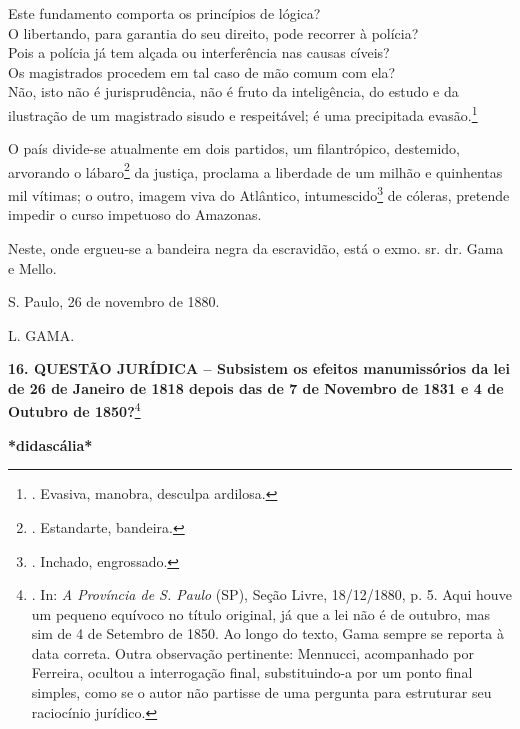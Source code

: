 Este fundamento comporta os princípios de lógica?\\
O libertando, para garantia do seu direito, pode recorrer à polícia?\\
Pois a polícia já tem alçada ou interferência nas causas cíveis?\\
Os magistrados procedem em tal caso de mão comum com ela?\\
Não, isto não é jurisprudência, não é fruto da inteligência, do estudo e
da ilustração de um magistrado sisudo e respeitável; é uma precipitada
evasão.\footnote{. Evasiva, manobra, desculpa ardilosa.}

O país divide-se atualmente em dois partidos, um filantrópico,
destemido, arvorando o lábaro\footnote{. Estandarte, bandeira.} da
justiça, proclama a liberdade de um milhão e quinhentas mil vítimas; o
outro, imagem viva do Atlântico, intumescido\footnote{. Inchado,
  engrossado.} de cóleras,
pretende impedir o curso impetuoso do Amazonas.

Neste, onde ergueu-se a bandeira negra da escravidão, está o exmo. sr.
dr. Gama e Mello.

S. Paulo, 26 de novembro de 1880.

L. GAMA.

\textbf{16. QUESTÃO JURÍDICA -- Subsistem os efeitos manumissórios da
lei de 26 de Janeiro de 1818 depois das de 7 de Novembro de 1831 e 4 de
Outubro de 1850?}\footnote{. In: \emph{A Província de S. Paulo} (SP),
  Seção Livre, 18/12/1880, p. 5. Aqui houve um pequeno equívoco no
  título original, já que a lei não é de outubro, mas sim de 4 de
  Setembro de 1850. Ao longo do texto, Gama sempre se reporta à data
  correta. Outra observação pertinente: Mennucci, acompanhado por
  Ferreira, ocultou a interrogação final, substituindo-a por um ponto
  final simples, como se o autor não partisse de uma pergunta para
  estruturar seu raciocínio jurídico.}

\textbf{*didascália*}

